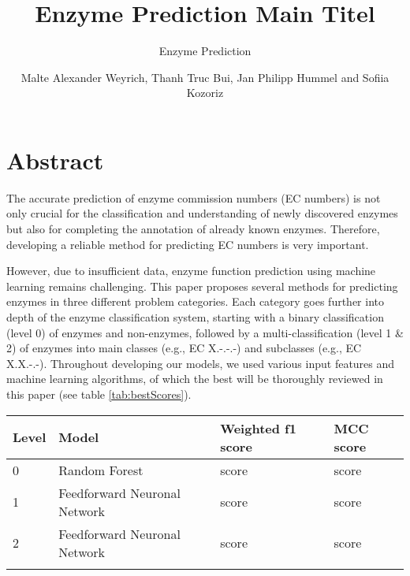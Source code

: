 \documentclass{bioinfo}
\begin{document}

\subtitle{Enzyme Prediction}

\title[]{Enzyme Prediction Main Titel}
\author[]{Malte Alexander Weyrich, Thanh Truc Bui, Jan Philipp Hummel
and  Sofiia Kozoriz}

\address{}
\corresp{}
\history{}
\editor{}


\maketitle


\section{Abstract}
The accurate prediction of enzyme commission numbers (EC numbers) is not only crucial for 
the classification and understanding of newly discovered enzymes but also for completing the annotation of already known enzymes.
Therefore, developing a reliable method for predicting EC numbers is very important.

However, due to insufficient data, enzyme function prediction using machine learning remains challenging.
This paper proposes several methods for predicting enzymes in three different problem categories. Each category goes further into depth
of the enzyme classification system, starting with a binary classification (level 0) of enzymes and non-enzymes, followed by a multi-classification (level 1 \& 2) of enzymes into main classes (e.g., EC X.-.-.-) and subclasses (e.g., EC X.X.-.-).
Throughout developing our models, we used various input features and machine learning algorithms, of which the best will be thoroughly reviewed in this paper (see table \ref{tab:bestScores}).

\begin{table}[!htbp]
 {\begin{tabular}{@{}llll@{}}\toprule 
		Level &  Model & Weighted f1 score & MCC score\\\midrule
		0 & Random Forest & score & score\\
		1 &  Feedforward Neuronal Network & score & score \\
		2 &  Feedforward Neuronal Network & score & score\\\botrule
\end{tabular}}{}
\end{table}
\end{document}
